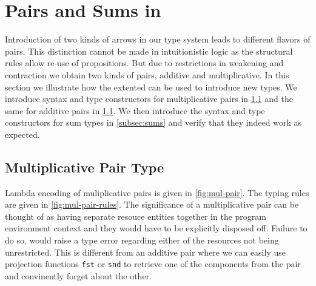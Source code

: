 
\section{Pairs and Sums in  \qub{}}\label{sec:pairs-types}
Introduction of two kinds of arrows in our type system leads to different flavors of pairs. This distinction cannot be made
in intuitionistic logic as the structural rules allow re-use of propositions. But due to restrictions in weakening and
contraction we obtain two kinds of pairs, additive and multiplicative. In this section we illustrate how the
extented \qub{} can be used to introduce new types. We introduce syntax and type constructors for multiplicative pairs in \cref{subsec:mul-pairs}
and the same for additive pairs in \cref{subsec:mul-pairs}. We then introduce the
syntax and type constructors for sum types in \cref{subsec:sums} and verify that they indeed work as expected.

\subsection{Multiplicative Pair Type}\label{subsec:mul-pairs}
Lambda encoding of muliplicative pairs is given in \cref{fig:mul-pair}. The typing rules
are given in \cref{fig:mul-pair-rules}. The significance of a multiplicative pair can be thought of as
having separate resouce entities together in the program environment context and they would have to be
explicitly disposed off. Failure to do so, would raise a type error regarding either of the resources
not being unrestricted. This is different from an additive pair where we can easily use projection functions
\texttt{fst} or \texttt{snd} to retrieve one of the components from the pair and convinently forget about the other.

